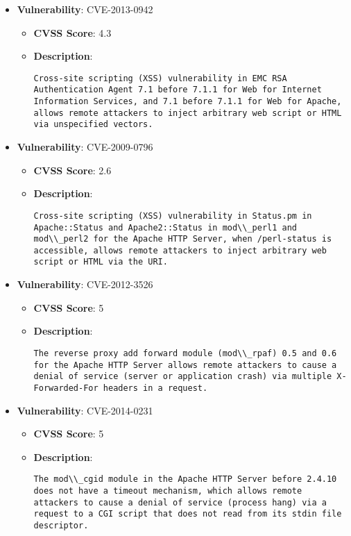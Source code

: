 \documentclass{article}
\begin{document}
\begin{itemize}
        \item \textbf{Vulnerability}: CVE-2013-0942
        \begin{itemize}
            \item \textbf{CVSS Score}:  4.3 
            \item \textbf{Description}:
            \parbox[t]{0.9\linewidth}{
                \verb|Cross-site scripting (XSS) vulnerability in EMC RSA Authentication Agent 7.1 before 7.1.1 for Web for Internet Information Services, and 7.1 before 7.1.1 for Web for Apache, allows remote attackers to inject arbitrary web script or HTML via unspecified vectors.|
            }
        \end{itemize}
    
        \item \textbf{Vulnerability}: CVE-2009-0796
        \begin{itemize}
            \item \textbf{CVSS Score}:  2.6 
            \item \textbf{Description}:
            \parbox[t]{0.9\linewidth}{
                \verb|Cross-site scripting (XSS) vulnerability in Status.pm in Apache::Status and Apache2::Status in mod\\_perl1 and mod\\_perl2 for the Apache HTTP Server, when /perl-status is accessible, allows remote attackers to inject arbitrary web script or HTML via the URI.|
            }
        \end{itemize}
    
        \item \textbf{Vulnerability}: CVE-2012-3526
        \begin{itemize}
            \item \textbf{CVSS Score}:  5 
            \item \textbf{Description}:
            \parbox[t]{0.9\linewidth}{
                \verb|The reverse proxy add forward module (mod\\_rpaf) 0.5 and 0.6 for the Apache HTTP Server allows remote attackers to cause a denial of service (server or application crash) via multiple X-Forwarded-For headers in a request.|
            }
        \end{itemize}
    
        \item \textbf{Vulnerability}: CVE-2014-0231
        \begin{itemize}
            \item \textbf{CVSS Score}:  5 
            \item \textbf{Description}:
            \parbox[t]{0.9\linewidth}{
                \verb|The mod\\_cgid module in the Apache HTTP Server before 2.4.10 does not have a timeout mechanism, which allows remote attackers to cause a denial of service (process hang) via a request to a CGI script that does not read from its stdin file descriptor.|
            }
        \end{itemize}
    

\end{itemize}
\end{document}
